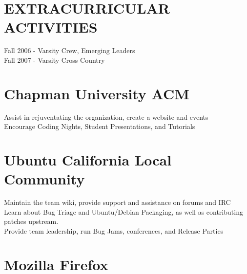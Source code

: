 \documentclass{res}
\begin{document}
\begin{resume}
\section{EXTRACURRICULAR ACTIVITIES}          
	 Fall 2006 - Varsity Crew, Emerging Leaders\\
	 Fall 2007 - Varsity Cross Country\\
\hspace{0.5in}\section{Chapman University ACM}
	 Assist in rejuventating the organization, create a website and events\\
	 Encourage Coding Nights, Student Presentations, and Tutorials\\
\hspace{0.5in}\section{Ubuntu California Local Community}
	 Maintain the team wiki, provide support and assistance on forums and IRC\\
	 Learn about Bug Triage and Ubuntu/Debian Packaging, as well as contributing patches upstream.\\
	 Provide team leadership, run Bug Jams, conferences, and Release Parties\\
\hspace{0.5in}\section{Mozilla Firefox}

\end{resume}
\end{document}
